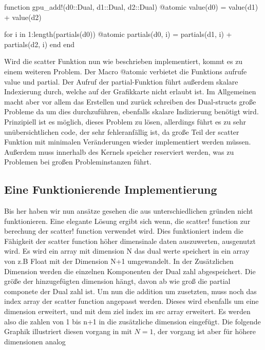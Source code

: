 \begin{listing}

function gpu_add!(d0::Dual, d1::Dual, d2::Dual)
	@atomic value(d0) = value(d1) + value(d2)
	
	for i in 1:length(partials(d0))
		@atomic partials(d0, i) = partials(d1, i) + partials(d2, i)
	end
end

\end{listing}

Wird die scatter Funktion nun wie beschrieben implementiert, kommt es zu einem weiteren Problem.
Der Macro @atomic verbietet die Funktions aufrufe value und partial.
Der Aufruf der partial-Funktion führt außerdem skalare Indexierung durch, welche auf der Grafikkarte nicht erlaubt ist.
Im Allgemeinen macht aber vor allem das Erstellen und zurück schreiben des Dual-structs große Probleme
da um dies durchzuführen, ebenfalls skalare Indizierung benötigt wird.
Prinzipiell ist es möglich, dieses Problem zu lösen, 
allerdings führt es zu sehr unübersichtlichen code, der sehr fehleranfällig ist, 
da große Teil der scatter Funktion mit minimalen Veränderungen wieder implementiert werden müssen.
Außerdem muss innerhalb des Kernels speicher reserviert werden, was zu Problemen bei großen Probleminstanzen führt.

\subsection{Eine Funktionierende Implementierung}

Bis her haben wir nun ansätze gesehen die aus unterschiedlichen gründen nicht funktionieren.
Eine elegante Lösung ergibt sich wenn, 
die scatter! function zur berechung der scatter! function verwendet wird.
Dies funktioniert indem die Fähigkeit der scatter function höher dimensinale daten auszuwerten, ausgenutzt wird. 
Es wird ein array mit dimension N das dual werte speichert in ein array von z.B Float mit der Dimension N+1 umgewandelt. 
In der Zusätzlichen Dimension werden die einzelnen Komponenten der Dual zahl abgespeichert.
Die größe der hinzugefügten dimension hängt, davon ab wie groß die partial componete der Dual zahl ist.
Um nun die addition um zusetzten, muss noch das index array der scatter function angepasst werden.
Dieses wird ebenfalls um eine dimension erweitert, und mit dem ziel index im src array erweitert.
Es werden also die zahlen von 1 bis n+1 in die zusätzliche dimension eingefügt.
Die folgende Graphik illustriert diesen vorgang in mit $N = 1$, der vorgang ist aber für höhere dimensionen analog

